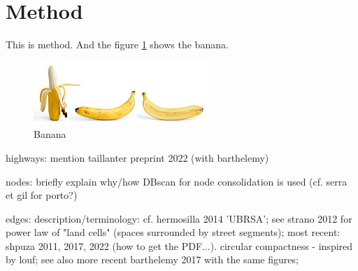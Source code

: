 \section{Method}
\label{sec:method}

This is method. And the figure \ref{fig:banana} shows the banana.

\begin{figure}
    \includegraphics[width=0.75\linewidth, center]{figures/banana.jpg}
    \caption{Banana}
    \label{fig:banana}
\end{figure}

highways: mention taillanter preprint 2022 (with barthelemy)

nodes: briefly explain why/how DBscan for node consolidation is used (cf. serra et gil for porto?)

edges: description/terminology: cf. hermosilla 2014 'UBRSA'; see strano 2012 for power law of "land cells" (spaces surrounded by street segments); most recent: shpuza 2011, 2017, 2022 (how to get the PDF...). circular compactness - inspired by louf; see also more recent barthelemy 2017 with the same figures; 